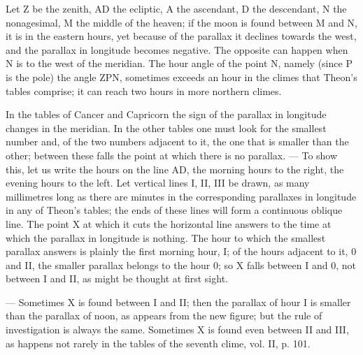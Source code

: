 \documentclass[11pt]{article}
\begin{document}
\begin{center}\end{center}
\par Let Z be the zenith, AD the ecliptic, A the ascendant, D the descendant, N the nonagesimal, M the middle of the heaven; if the moon is found between M and N, it is in the eastern hours, yet because of the parallax it declines towards the west, and the parallax in longitude becomes negative. The opposite can happen when N is to the west of the meridian. The hour angle of the point N, namely (since P is the pole) the angle ZPN, sometimes exceeds an hour in the climes that Theon's tables comprise; it can reach two hours in more northern climes.\par
\par In the tables of Cancer and Capricorn the sign of the parallax in longitude changes in the meridian. In the other tables one must look for the smallest number and, of the two numbers adjacent to it, the one that is smaller than the other; between these falls the point at which there is no parallax. — To show this, let us write the hours on the line AD, the morning hours to the right, the evening hours to the left. Let vertical lines I, II, III be drawn, as many millimetres long as there are minutes in the corresponding parallaxes in longitude in any of Theon's tables; the ends of these lines will form a continuous oblique line. The point X at which it cuts the horizontal line answers to the time at which the parallax in longitude is nothing. The hour to which the smallest parallax answers is plainly the first morning hour, I; of the hours adjacent to it, 0 and II, the smaller parallax belongs to the hour 0; so X falls between I and 0, not between I and II, as might be thought at first sight.\par
\begin{center}\end{center}
\par — Sometimes X is found between I and II; then the parallax of hour I is smaller than the parallax of noon, as appears from the new figure; but the rule of investigation is always the same. Sometimes X is found even between II and III, as happens not rarely in the tables of the seventh clime, vol. II, p. 101.\par
\begin{center}\end{center}
\end{document}
